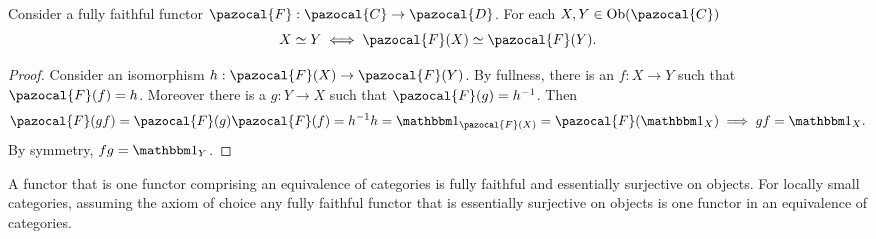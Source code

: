     \begin{lemma}
        Consider a fully faithful functor $\pazocal{F}:\pazocal{C}\rightarrow \pazocal{D}$. For each $X,Y\in \Ob(\pazocal{C})$
            $$
                X\simeq Y \iff \pazocal{F}(X) \simeq \pazocal{F}(Y).
            $$
    \end{lemma}
    \begin{proof}
        Consider an isomorphism $h : \pazocal{F}(X)\rightarrow \pazocal{F}(Y)$. By fullness, there is an $f:X\rightarrow Y$ such that $\pazocal{F}(f)=h$. Moreover there is a $g:Y\rightarrow X$ such that $\pazocal{F}(g)=h^{-1}$. Then 
        $$\pazocal{F}(gf) = \pazocal{F}(g)\pazocal{F}(f)=h^{-1}h=\fone_{\pazocal{F}(X)} = \pazocal{F}(\fone_X) \implies gf = \fone_X.$$
        By symmetry, $fg = \fone_Y$.   
    \end{proof}
    \begin{theorem}\label{EquivOfCatIsFFFESO}
        A functor that is one functor comprising an equivalence of categories is fully faithful and essentially surjective on objects. For locally small categories, assuming the axiom of choice any fully faithful functor that is essentially surjective on objects is one functor in an equivalence of categories.  
    \end{theorem}
